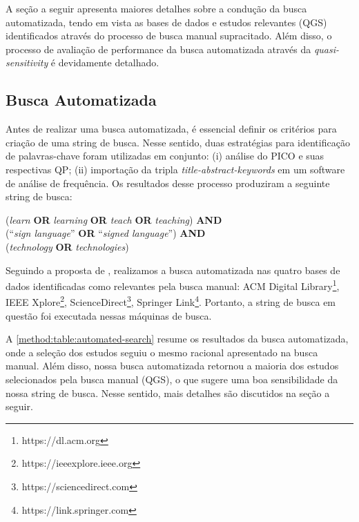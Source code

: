 A seção a seguir apresenta maiores detalhes sobre a condução da busca automatizada, tendo em vista as bases de dados e estudos relevantes (QGS) identificados através do processo de busca manual supracitado. Além disso, o processo de avaliação de performance da busca automatizada através da \textit{quasi-sensitivity} é devidamente detalhado.

\subsection{Busca Automatizada}
\label{ms:conducao-busca-automatizada}

Antes de realizar uma busca automatizada, é essencial definir os critérios para criação de uma string de busca. Nesse sentido, duas estratégias para identificação de palavras-chave foram utilizadas em conjunto: (i) análise do PICO e suas respectivas QP; (ii) importação da tripla \textit{title-abstract-keywords} em um software de análise de frequência. Os resultados desse processo produziram a seguinte string de busca:

\begin{center}
    (\textit{learn} \textbf{OR} \textit{learning} \textbf{OR} \textit{teach} \textbf{OR} \textit{teaching}) \textbf{AND}\\
    (``\textit{sign language}'' \textbf{OR} ``\textit{signed language}'') \textbf{AND}\\
    (\textit{technology} \textbf{OR} \textit{technologies})\\
\end{center}

Seguindo a proposta de , realizamos a busca automatizada nas quatro bases de dados identificadas como relevantes pela busca manual: ACM Digital Library\footnote{https://dl.acm.org}, IEEE Xplore\footnote{https://ieeexplore.ieee.org}, ScienceDirect\footnote{https://sciencedirect.com}, Springer Link\footnote{https://link.springer.com}. Portanto, a string de busca em questão foi executada nessas máquinas de busca.

A \autoref{method:table:automated-search} resume os resultados da busca automatizada, onde a seleção dos estudos seguiu o mesmo racional apresentado na busca manual. Além disso, nossa busca automatizada retornou a maioria dos estudos selecionados pela busca manual (QGS), o que sugere uma boa sensibilidade da nossa string de busca. Nesse sentido, mais detalhes são discutidos na seção a seguir.


